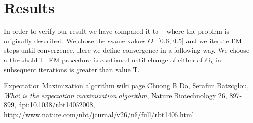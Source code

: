 \documentclass[11pt]{article}
\begin{document}
\section{Results}
In order to verify our result we have compared it to ~\cite{nature} where the problem is originally described. We chose the ssame values $\Theta$=[0.6, 0.5] and we iterate EM steps until convergence. Here we define convergence in a following way. We choose a threshold T. EM procedure is continued until change of either of $\Theta_k$ in subsequent iterations is greater than value T. 



\begin{thebibliography}{} 
 Expectation Maximization algorithm wiki page
 Chuong B Do,  Serafim Batzoglou, \emph{What is the expectation maximization algorithm}, Nature Biotechnology 26, 897-899, dpi:10.1038/nbt14052008, \url{http://www.nature.com/nbt/journal/v26/n8/full/nbt1406.html}

\end{thebibliography}
\end{document}
